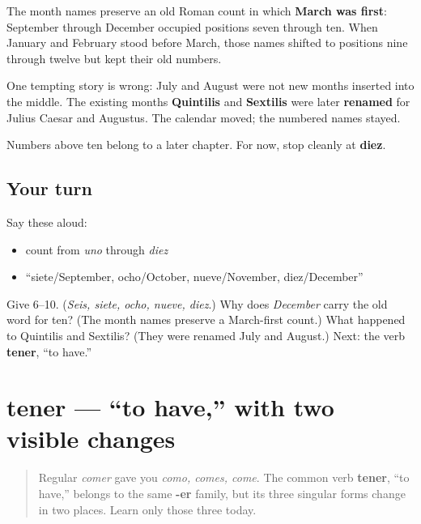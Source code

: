 \begin{culture}
The month names preserve an old Roman count in which \textbf{March was first}: September through December occupied positions seven through ten. When January and February stood before March, those names shifted to positions nine through twelve but kept their old numbers.

One tempting story is wrong: July and August were not new months inserted into the middle. The existing months \textbf{Quintilis} and \textbf{Sextilis} were later \textbf{renamed} for Julius Caesar and Augustus. The calendar moved; the numbered names stayed.

Numbers above ten belong to a later chapter. For now, stop cleanly at \textbf{diez}.
\end{culture}

\subsection*{Your turn}
Say these aloud:

\begin{itemize}
\raggedright
  \item count from \emph{uno} through \emph{diez}
  \item “siete/September, ocho/October, nueve/November, diez/December”
\end{itemize}

\begin{tcolorbox}[breakable,colback=teal!4,colframe=teal!35!black,title={Before you move on}]
Give 6–10. (\emph{Seis, siete, ocho, nueve, diez}.) Why does \emph{December} carry the old word for ten? (The month names preserve a March-first count.) What happened to Quintilis and Sextilis? (They were renamed July and August.) Next: the verb \textbf{tener}, “to have.”
\end{tcolorbox}
\section[tener]{tener — “to have,” with two visible changes}

\label{lesson:ES-C08-tener}



\begin{quote}
Regular \emph{comer} gave you \emph{como, comes, come}. The common verb \textbf{tener}, “to have,” belongs to the same \textbf{-er} family, but its three singular forms change in two places. Learn only those three today.
\end{quote}

